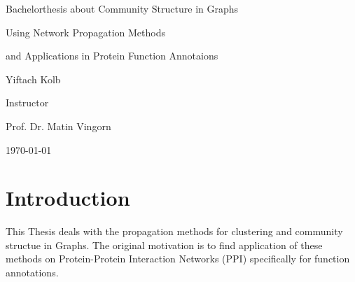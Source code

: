 \documentclass[a4paper,10pt]{article}
\theoremstyle{definition}
\theoremstyle{remark}
\theoremstyle{plain}
\begin{document}
\renewcommand{\thesubsection}{\thesection.\alph{subsection}}\renewcommand{\thesubsection}{\thesection.\alph{subsection}}

\begin{titlepage}
	\centering
    {\scshape\LARGE \par Bachelorthesis about Community Structure in Graphs
    \par Using Network Propagation Methods 
    \par and Applications in Protein Function Annotaions}
    \vfill
  	{\Large Yiftach Kolb \par}
    \vfill
	  {\Large Instructor\par
    Prof. Dr. Matin Vingorn 
    \par}
    {\large \today\par}
\end{titlepage}





\section{Introduction}
This Thesis deals with the propagation methods for clustering and community structue in
Graphs.
The original motivation is to find application
of these methods on Protein-Protein Interaction Networks (PPI) specifically for
function annotations.
\end{document}
